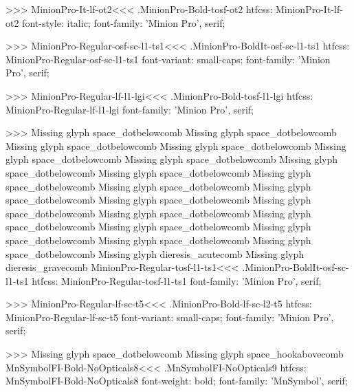 {>>>
\<MinionPro-It-lf-ot2\><<<
.MinionPro-Bold-tosf-ot2
htfcss:  MinionPro-It-lf-ot2  font-style: italic; font-family: 'Minion Pro', serif;

>>>
\<MinionPro-Regular-osf-sc-l1-ts1\><<<
.MinionPro-BoldIt-osf-sc-l1-ts1
htfcss:  MinionPro-Regular-osf-sc-l1-ts1  font-variant: small-caps; font-family: 'Minion Pro', serif;

>>>
\<MinionPro-Regular-lf-l1-lgi\><<<
.MinionPro-Bold-tosf-l1-lgi
htfcss:  MinionPro-Regular-lf-l1-lgi  font-family: 'Minion Pro', serif;

>>>
Missing glyph	space_dotbelowcomb
Missing glyph	space_dotbelowcomb
Missing glyph	space_dotbelowcomb
Missing glyph	space_dotbelowcomb
Missing glyph	space_dotbelowcomb
Missing glyph	space_dotbelowcomb
Missing glyph	space_dotbelowcomb
Missing glyph	space_dotbelowcomb
Missing glyph	space_dotbelowcomb
Missing glyph	space_dotbelowcomb
Missing glyph	space_dotbelowcomb
Missing glyph	space_dotbelowcomb
Missing glyph	space_dotbelowcomb
Missing glyph	space_dotbelowcomb
Missing glyph	space_dotbelowcomb
Missing glyph	space_dotbelowcomb
Missing glyph	space_dotbelowcomb
Missing glyph	space_dotbelowcomb
Missing glyph	space_dotbelowcomb
Missing glyph	dieresis_acutecomb
Missing glyph	dieresis_gravecomb
\<MinionPro-Regular-tosf-l1-ts1\><<<
.MinionPro-BoldIt-osf-sc-l1-ts1
htfcss:  MinionPro-Regular-tosf-l1-ts1  font-family: 'Minion Pro', serif;

>>>
\<MinionPro-Regular-lf-sc-t5\><<<
.MinionPro-Bold-lf-sc-l2-t5
htfcss:  MinionPro-Regular-lf-sc-t5  font-variant: small-caps; font-family: 'Minion Pro', serif;

>>>
Missing glyph	space_dotbelowcomb
Missing glyph	space_hookabovecomb
\<MnSymbolFI-Bold-NoOpticals8\><<<
.MnSymbolFI-NoOpticals9
htfcss:  MnSymbolFI-Bold-NoOpticals8  font-weight: bold; font-family: 'MnSymbol', serif;

}
